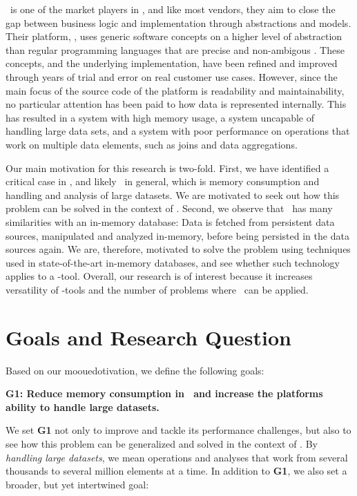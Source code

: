 \genus~is one of the market players in \mde, and like most vendors, they aim to close the gap between business logic and implementation through abstractions and models. Their platform, \gap, uses generic software concepts on a higher level of abstraction than regular programming languages that are precise and non-ambigous \cite{noauthor_undated-qy}. These concepts, and the underlying implementation, have been refined and improved through years of trial and error on real customer use cases. However, since the main focus of the source code of the platform is readability and maintainability, no particular attention has been paid to how data is represented internally. This has resulted in a system with high memory usage, a system uncapable of handling large data sets, and a system with poor performance on operations that work on multiple data elements, such as joins and data aggregations.

Our main motivation for this research is two-fold. First, we have identified a critical case in \gap, and likely \mde~in general, which is memory consumption and handling and analysis of large datasets. We are motivated to seek out how this problem can be solved in the context of \mdd. Second, we observe that \gap~has many similarities with an in-memory database: Data is fetched from persistent data sources, manipulated and analyzed in-memory, before being persisted in the data sources again. We are, therefore, motivated to solve the problem using techniques used in state-of-the-art in-memory databases, and see whether such technology applies to a \mde-tool. Overall, our research is of interest because it increases versatility of \mdd-tools and the number of problems where \mde~can be applied.

\section{Goals and Research Question}
\label{sec:Goals and Research Question}
Based on our moouedotivation, we define the following goals:

\setlength{\leftskip}{1cm}

\textbf{G1: Reduce memory consumption in \gap~and increase the platforms ability to handle large datasets.}

\setlength{\leftskip}{0pt}

We set \textbf{G1} not only to improve \gap and tackle its performance challenges, but also to see how this problem can be generalized and solved in the context of \mde. By \textit{handling large datasets}, we mean operations and analyses that work from several thousands to several million elements at a time. In addition to \textbf{G1}, we also set a broader, but yet intertwined goal:

